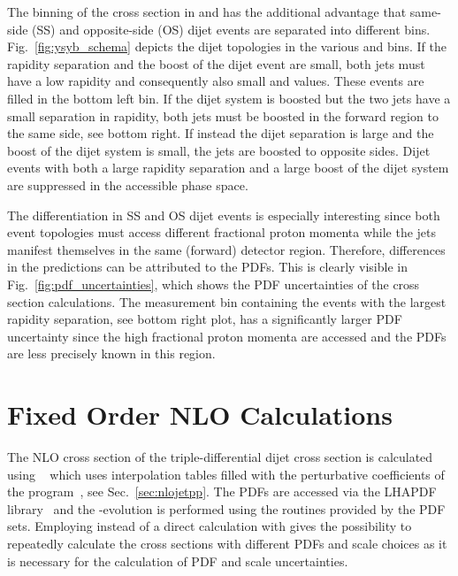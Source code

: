 The binning of the cross section in \ystar and \yboost has the additional
advantage that same-side (SS) and opposite-side (OS) dijet events are separated into
different bins. Fig.~\ref{fig:ysyb_schema} depicts the dijet topologies in the
various \ystar and \yboost bins. If the rapidity separation and the boost of the
dijet event are small, both jets must have a low rapidity and consequently also
small \ystar and \yboost values. These events are filled in the bottom left bin.
If the dijet system is boosted but the two jets have a small separation in
rapidity, both jets must be boosted in the forward region to the same side, see
bottom right. If instead the dijet separation is large and the boost of the
dijet system is small, the jets are boosted to opposite sides. Dijet events with
both a large rapidity separation and a large boost of the dijet system are
suppressed in the accessible phase space.

The differentiation in SS and OS dijet events is especially interesting since
both event topologies must access different fractional proton momenta while the
jets manifest themselves in the same (forward) detector region. Therefore,
differences in the predictions can be attributed to the PDFs. This is clearly
visible in Fig.~\ref{fig:pdf_uncertainties}, which shows the PDF uncertainties of
the cross section calculations. The measurement bin containing the events with
the largest rapidity separation, see bottom right plot, has a significantly larger
PDF uncertainty since the high fractional proton momenta are accessed and the
PDFs are less precisely known in this region.

\section{Fixed Order NLO Calculations}

The NLO cross section of the triple-differential dijet cross section is
calculated using \fastnlo~\cite{Kluge:2006xs,Britzger:2012bs} which uses
interpolation tables filled with the perturbative coefficients of the \NLOJETPP
program~\cite{Nagy:2003tz}, see Sec.~\ref{sec:nlojetpp}. The PDFs are accessed
via the LHAPDF library~\cite{Whalley:2005nh,Buckley:2014ana} and the
\as-evolution is performed using the routines provided by the PDF sets.
Employing \fastnlo instead of a direct calculation with \NLOJETPP gives the
possibility to repeatedly calculate the cross sections with  different PDFs and
scale choices as it is necessary for the calculation of PDF and scale
uncertainties.

